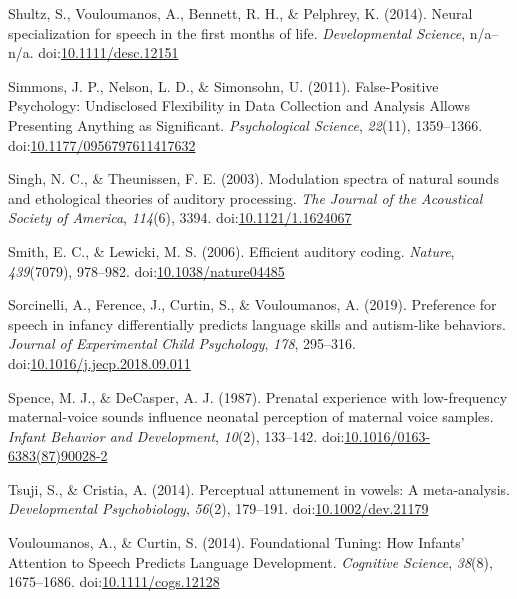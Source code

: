 \documentclass[man]{apa6}
\begin{document}
\hypertarget{ref-shultz_neural_2014}{}
Shultz, S., Vouloumanos, A., Bennett, R. H., \& Pelphrey, K. (2014).
Neural specialization for speech in the first months of life.
\emph{Developmental Science}, n/a--n/a.
doi:\href{https://doi.org/10.1111/desc.12151}{10.1111/desc.12151}

\hypertarget{ref-simmons_false-positive_2011}{}
Simmons, J. P., Nelson, L. D., \& Simonsohn, U. (2011). False-Positive
Psychology: Undisclosed Flexibility in Data Collection and Analysis
Allows Presenting Anything as Significant. \emph{Psychological Science},
\emph{22}(11), 1359--1366.
doi:\href{https://doi.org/10.1177/0956797611417632}{10.1177/0956797611417632}

\hypertarget{ref-singh_modulation_2003}{}
Singh, N. C., \& Theunissen, F. E. (2003). Modulation spectra of natural
sounds and ethological theories of auditory processing. \emph{The
Journal of the Acoustical Society of America}, \emph{114}(6), 3394.
doi:\href{https://doi.org/10.1121/1.1624067}{10.1121/1.1624067}

\hypertarget{ref-smith_efficient_2006}{}
Smith, E. C., \& Lewicki, M. S. (2006). Efficient auditory coding.
\emph{Nature}, \emph{439}(7079), 978--982.
doi:\href{https://doi.org/10.1038/nature04485}{10.1038/nature04485}

\hypertarget{ref-sorcinelli_preference_2019}{}
Sorcinelli, A., Ference, J., Curtin, S., \& Vouloumanos, A. (2019).
Preference for speech in infancy differentially predicts language skills
and autism-like behaviors. \emph{Journal of Experimental Child
Psychology}, \emph{178}, 295--316.
doi:\href{https://doi.org/10.1016/j.jecp.2018.09.011}{10.1016/j.jecp.2018.09.011}

\hypertarget{ref-spence_prenatal_1987}{}
Spence, M. J., \& DeCasper, A. J. (1987). Prenatal experience with
low-frequency maternal-voice sounds influence neonatal perception of
maternal voice samples. \emph{Infant Behavior and Development},
\emph{10}(2), 133--142.
doi:\href{https://doi.org/10.1016/0163-6383(87)90028-2}{10.1016/0163-6383(87)90028-2}

\hypertarget{ref-tsuji_perceptual_2014}{}
Tsuji, S., \& Cristia, A. (2014). Perceptual attunement in vowels: A
meta-analysis. \emph{Developmental Psychobiology}, \emph{56}(2),
179--191.
doi:\href{https://doi.org/10.1002/dev.21179}{10.1002/dev.21179}

\hypertarget{ref-vouloumanos_foundational_2014}{}
Vouloumanos, A., \& Curtin, S. (2014). Foundational Tuning: How Infants'
Attention to Speech Predicts Language Development. \emph{Cognitive
Science}, \emph{38}(8), 1675--1686.
doi:\href{https://doi.org/10.1111/cogs.12128}{10.1111/cogs.12128}
\end{document}
